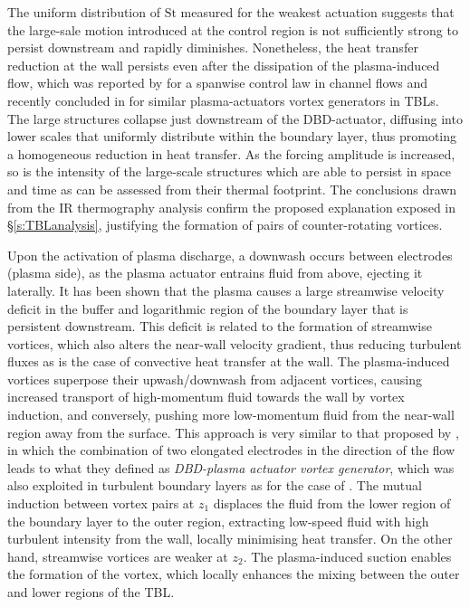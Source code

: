 The uniform distribution of $\mathrm{St}$ measured for the weakest actuation suggests that the large-sale motion introduced at the control region is not sufficiently strong to persist downstream and rapidly diminishes. Nonetheless, the heat transfer reduction at the wall persists even after the dissipation of the plasma-induced flow, which was reported by \citet{Schoppa1998} for a spanwise control law in channel flows and recently concluded in \citet{cheng_wong_hussain_schroder_zhou_2021} for similar plasma-actuators vortex generators in TBLs. The large structures collapse just downstream of the DBD-actuator, diffusing into lower scales that uniformly distribute within the boundary layer, thus promoting a homogeneous reduction in heat transfer. As the forcing amplitude is increased, so is the intensity of the large-scale structures which are able to persist in space and time as can be assessed from their thermal footprint. The conclusions drawn from the IR thermography analysis confirm the proposed explanation exposed in \S\ref{s:TBLanalysis}, justifying the formation of pairs of counter-rotating vortices. 

Upon the activation of plasma discharge, a downwash occurs between electrodes (plasma side), as the plasma actuator entrains fluid from above, ejecting it laterally. It has been shown that the plasma causes a large streamwise velocity deficit in the buffer and logarithmic region of the boundary layer that is persistent downstream. This deficit is related to the formation of streamwise vortices, which also alters the near-wall velocity gradient, thus reducing turbulent fluxes as is the case of convective heat transfer at the wall. The plasma-induced vortices superpose their upwash/downwash from adjacent vortices, causing increased transport of high-momentum fluid towards the wall by vortex induction, and conversely, pushing more low-momentum fluid from the near-wall region away from the surface. This approach is very similar to that proposed by \citet{jukes2013plasmaVG}, in which the combination of two elongated electrodes in the direction of the flow leads to what they defined as \textit{DBD-plasma actuator vortex generator}, which was also exploited in turbulent boundary layers as for the case of \citet{Wicks2015}.
The mutual induction between vortex pairs at $z_1$ displaces the fluid from the lower region of the boundary layer to the outer region, extracting low-speed fluid with high turbulent intensity from the wall, locally minimising heat transfer. On the other hand, streamwise vortices are weaker at $z_2$. The plasma-induced suction enables the formation of the vortex, which locally enhances the mixing between the outer and lower regions of the TBL. 
 
